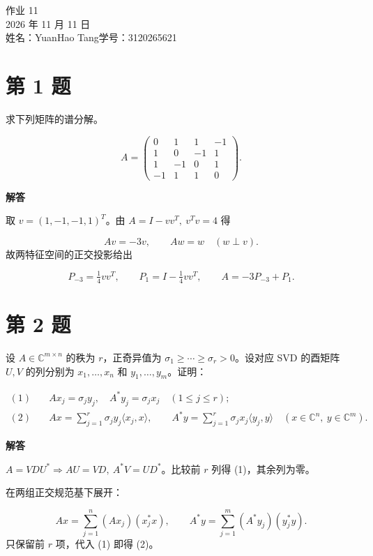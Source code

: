 \documentclass[UTF8,10pt,letterpaper,fontset=fandol]{ctexart}
\newcommand{\C}{\mathbb C}
\newcommand{\ip}[2]{\langle #1,#2\rangle}
\begin{document}
\begin{center}
{\LARGE 作业 11}\\[0.5em]
2026 年 11 月 11 日\\[0.25em]
姓名：YuanHao Tang\quad 学号：3120265621
\end{center}
\section{第 1 题}
求下列矩阵的谱分解。\par
\[A=\begin{pmatrix}0&1&1&-1\\1&0&-1&1\\1&-1&0&1\\-1&1&1&0\end{pmatrix}.\]
\par{}\textbf{解答}\par
取 $v=(1,-1,-1,1)^T$。由 $A=I-vv^T,\ v^Tv=4$ 得\par
\[Av=-3v,\qquad Aw=w\quad(w\perp v).\]
故两特征空间的正交投影给出\par
\[P_{-3}=\tfrac14 vv^T,\qquad P_1=I-\tfrac14 vv^T,\qquad
\boxed{A=-3P_{-3}+P_1}.\]

\section{第 2 题}
设 $A\in\C^{m\times n}$ 的秩为 $r$，正奇异值为 $\sigma_1\ge\cdots\ge\sigma_r>0$。设对应 SVD 的酉矩阵 $U,V$ 的列分别为 $x_1,\ldots,x_n$ 和 $y_1,\ldots,y_m$。证明：\par
\begin{align*}
(1)\quad &Ax_j=\sigma_j y_j,\quad A^*y_j=\sigma_jx_j\quad(1\le j\le r);\\
(2)\quad &Ax=\sum_{j=1}^r\sigma_j y_j\ip{x_j}{x},\qquad
 A^*y=\sum_{j=1}^r\sigma_j x_j\ip{y_j}{y}
 \quad(x\in\C^n,\ y\in\C^m).
\end{align*}
\par{}\textbf{解答}\par
$A=VDU^*\Rightarrow AU=VD,\ A^*V=UD^*$。比较前 $r$ 列得 (1)，其余列为零。\par
在两组正交规范基下展开：\par
\[
 Ax=\sum_{j=1}^n (Ax_j)(x_j^*x),\qquad
 A^*y=\sum_{j=1}^m(A^*y_j)(y_j^*y).
\]
只保留前 $r$ 项，代入 (1) 即得 (2)。\par
\newpage
\end{document}
